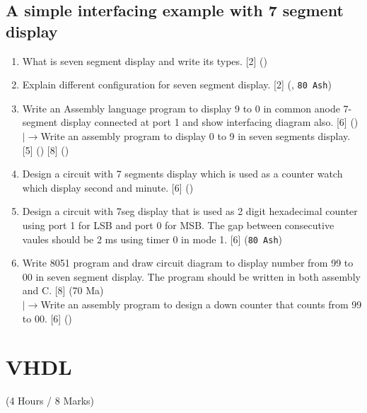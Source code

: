 \documentclass[12pt]{article}
\newcommand{\lb}{\\$\left|\rightarrow\right.$}
\begin{document}
  \subsection{A simple interfacing example with 7 segment display}
    \begin{enumerate}
      \item What is seven segment display and write its types. \hfill [2] ()

      \item Explain different configuration for seven segment display. \hfill [2] (, \texttt{80 Ash})

      \item Write an Assembly language program to display 9 to 0 in common anode 7-segment display connected at port 1 and show interfacing diagram also. \hfill [6] ()
      \lb Write an assembly program to display 0 to 9 in seven segments display. \hfill [5] () [8] ()

      \item Design a circuit with 7 segments display which is used as a counter watch which display second and minute. \hfill [6] ()

      \item Design a circuit with 7seg display that is used as 2 digit hexadecimal counter using port 1 for LSB and port 0 for MSB. The gap between consecutive vaules should be 2 ms using timer 0 in mode 1. \hfill [6] (\texttt{80 Ash})

      \item Write 8051 program and draw circuit diagram to display number from 99 to 00 in seven segment display. The program should be written in both assembly and C. \hfill [8] (70 Ma)
        \lb Write an assembly program to design a down counter that counts from 99 to 00. \hfill [6] ()
    \end{enumerate}

\pagebreak

\section{VHDL}
  \begin{center}(4 Hours / 8 Marks)\end{center}
  
\end{document}
